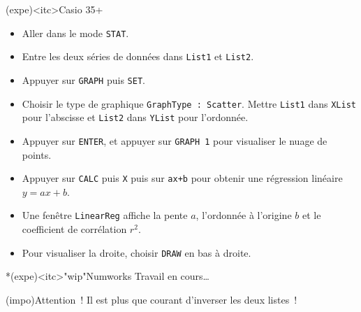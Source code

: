 \documentclass[a4paper, 12pt, garamond]{book}
\begin{document}
\begin{tcb}[breakable](expe)<itc>{Casio 35+}
	\begin{itemize}[leftmargin=10pt]
		\item Aller dans le mode \texttt{STAT}.
		\item Entre les deux séries de données dans \texttt{List1} et
		      \texttt{List2}.
		\item Appuyer sur \texttt{GRAPH} puis \texttt{SET}.
		\item Choisir le type de graphique \texttt{GraphType~: Scatter}. Mettre
		      \texttt{List1} dans \texttt{XList} pour l'abscisse et \texttt{List2}
		      dans \texttt{YList} pour l'ordonnée.
		\item Appuyer sur \texttt{ENTER}, et appuyer sur \texttt{GRAPH 1} pour
		      visualiser le nuage de points.
		\item Appuyer sur \texttt{CALC} puis \texttt{X} puis sur \texttt{ax+b} pour
		      obtenir une régression linéaire $y = ax+b$.
		\item Une fenêtre \texttt{LinearReg} affiche la pente $a$, l'ordonnée à
		      l'origine $b$ et le coefficient de corrélation $r^{2}$.
		\item Pour visualiser la droite, choisir \texttt{DRAW} en bas à droite.
	\end{itemize}
\end{tcb}

\begin{tcb}*(expe)<itc>"wip"{Numworks}
	Travail en cours…
	\vfill
\end{tcb}

\begin{tcb}(impo){Attention~!}
	Il est plus que courant d'inverser les deux listes~!
\end{tcb}
\end{document}
